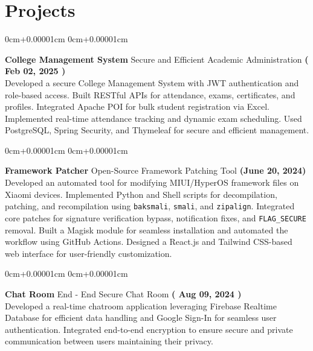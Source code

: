 \documentclass[10pt,a4paper]{article}
\newenvironment{onecolentry}{
    \begin{adjustwidth}{
        0cm+0.00001cm
    }{
        0cm+0.00001cm
    }
    }{
    \end{adjustwidth}
}
\begin{document}
\section{Projects}\label{sec:projects}

\begin{onecolentry}
    \textbf{College Management System} Secure and Efficient Academic Administration \hfill \textbf{( Feb 02, 2025 )} \\
    Developed a secure College Management System with JWT authentication and role-based access.
    Built RESTful APIs for attendance, exams, certificates, and profiles.
    Integrated Apache POI for bulk student registration via Excel.
    Implemented real-time attendance tracking and dynamic exam scheduling.
    Used PostgreSQL, Spring Security, and Thymeleaf for secure and efficient management.
\end{onecolentry}
\vspace{0.1cm}
\begin{onecolentry}
    \textbf{Framework Patcher} Open-Source Framework Patching Tool \hfill \textbf{(June 20, 2024)} \\
    Developed an automated tool for modifying MIUI/HyperOS framework files on Xiaomi devices.
    Implemented Python and Shell scripts for decompilation, patching, and recompilation using \texttt{baksmali}, \texttt{smali}, and \texttt{zipalign}.
    Integrated core patches for signature verification bypass, notification fixes, and \texttt{FLAG\_SECURE} removal.
    Built a Magisk module for seamless installation and automated the workflow using GitHub Actions.
    Designed a React.js and Tailwind CSS-based web interface for user-friendly customization.
\end{onecolentry}
\vspace{0.1cm}
\begin{onecolentry}
    \textbf{Chat Room} End - End Secure Chat Room \hfill \textbf{( Aug 09, 2024 )} \\
    Developed a real-time chatroom application leveraging Firebase Realtime Database for efficient data handling and Google
    Sign-In for seamless user authentication.
    Integrated end-to-end encryption to ensure secure and private communication between
    users maintaining their privacy.
\end{onecolentry}
\end{document}
